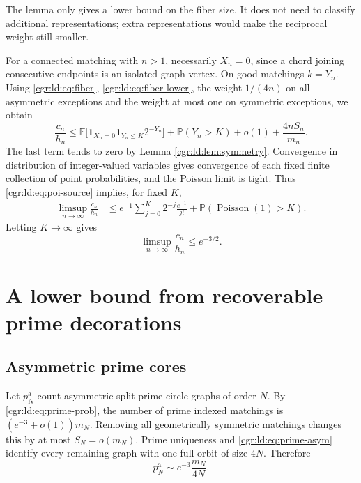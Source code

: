 \documentclass[11pt,letterpaper]{article}
\numberwithin{equation}{section}
\theoremstyle{definition}\newtheorem{definition}[theorem]{Definition}
\theoremstyle{remark}\newtheorem{remark}[theorem]{Remark}
\newcommand{\PP}{\mathbb P}
\newcommand{\EE}{\mathbb E}
\newcommand{\one}{\mathbf1}
\DeclareMathOperator{\Poi}{Poisson}
\begin{document}
The lemma only gives a lower bound on the fiber size. It does not
need to classify additional representations; extra representations
would make the reciprocal weight still smaller.

For a connected matching with $n>1$, necessarily $X_n=0$, since
a chord joining consecutive endpoints is an isolated graph vertex.
On good matchings $k=Y_n$. Using \eqref{cgr:ld:eq:fiber},
\eqref{cgr:ld:eq:fiber-lower}, the weight $1/(4n)$ on all asymmetric
exceptions and the weight at most one on symmetric exceptions,
we obtain
\begin{equation}\label{cgr:ld:eq:upper-before-limit}
 \frac{c_n}{h_n}\le
 \EE\bigl[\one_{X_n=0}\one_{Y_n\le K}2^{-Y_n}\bigr]
 +\PP(Y_n>K)+o(1)+\frac{4nS_n}{m_n}.
\end{equation}
The last term tends to zero by Lemma \ref{cgr:ld:lem:symmetry}.
Convergence in distribution of integer-valued variables gives
convergence of each fixed finite collection of point
probabilities, and the Poisson limit is tight. Thus
\eqref{cgr:ld:eq:poi-source} implies, for fixed $K$,
\begin{align}
 \limsup_{n\to\infty}\frac{c_n}{h_n}
 &\le e^{-1}\sum_{j=0}^{K}2^{-j}\frac{e^{-1}}{j!}
       +\PP(\Poi(1)>K).\label{cgr:ld:eq:upper-truncation}
\end{align}
Letting $K\to\infty$ gives
\begin{equation}\label{cgr:ld:eq:upper-final}
 \limsup_{n\to\infty}\frac{c_n}{h_n}\le e^{-3/2}.
\end{equation}

\section{A lower bound from recoverable prime decorations}\label{cgr:ld:sec:lower}
\subsection{Asymmetric prime cores}
Let $p_N^{\mathrm a}$ count asymmetric split-prime circle graphs
of order $N$. By \eqref{cgr:ld:eq:prime-prob}, the number of prime
indexed matchings is $(e^{-3}+o(1))m_N$. Removing all geometrically
symmetric matchings changes this by at most $S_N=o(m_N)$.
Prime uniqueness and \eqref{cgr:ld:eq:prime-asym} identify every remaining
graph with one full orbit of size $4N$. Therefore
\begin{equation}\label{cgr:ld:eq:prime-count}
 p_N^{\mathrm a}\sim e^{-3}\frac{m_N}{4N}.
\end{equation}
\end{document}
